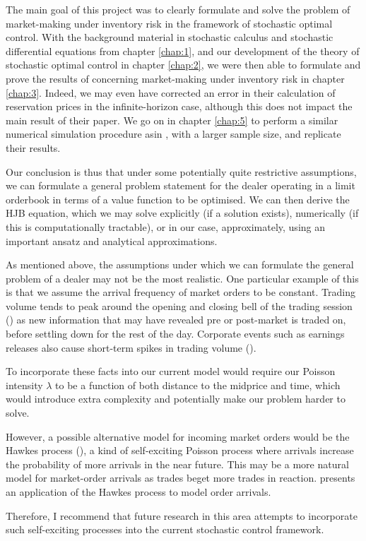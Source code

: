 The main goal of this project was to clearly formulate and solve the problem of 
market-making under inventory risk in the framework of stochastic optimal control.
With the background material in stochastic calculus and stochastic differential 
equations from chapter \ref{chap:1}, and our development of the theory of 
stochastic optimal control in chapter \ref{chap:2}, we were then able to formulate 
and prove the results of \textcite{AS2008} concerning market-making under inventory 
risk in chapter \ref{chap:3}. Indeed, we may even have corrected an error in their calculation
of reservation prices in the infinite-horizon case, although this does not impact the 
main result of their paper. We go on in chapter \ref{chap:5} to perform a similar  
numerical simulation procedure asin \textcite{AS2008}, with a larger sample size, 
and replicate their results.

Our conclusion is thus that under some potentially quite restrictive assumptions,
we can formulate a general problem statement for the dealer operating in a limit 
orderbook in terms of a value function to be optimised. We can then derive the 
HJB equation, which we may solve explicitly (if a solution exists),
numerically (if this is computationally tractable), or in our case, approximately, using 
an important ansatz and analytical approximations.

As mentioned above, the assumptions under which we can formulate the general 
problem of a dealer may not be the most realistic. One particular example of this 
is that we assume the arrival frequency of market orders to be constant. Trading volume 
tends to peak around the opening and closing bell of the trading session 
(\cite{volume}) as new information that may have revealed pre or post-market is traded
on, before settling down for the rest of the day. Corporate events such as earnings 
releases also cause short-term spikes in trading volume (\cite{EarningsPremium}). 

To incorporate these facts into our current model would require our Poisson 
intensity $\lambda$ to be a function of both distance to the midprice and time, which 
would introduce extra complexity and potentially make our problem harder to solve. 

However, a possible alternative model for incoming market orders would be the Hawkes process
(\cite{Hawkes}), a kind of self-exciting Poisson process where arrivals increase the 
probability of more arrivals in the near future. This may be a more natural model for 
market-order arrivals as trades beget more trades in reaction. \textcite{Hawkes2}
presents an application of the Hawkes process to model order arrivals. 

Therefore, I recommend that future research in this area attempts to incorporate 
such self-exciting processes into the current stochastic control framework.
